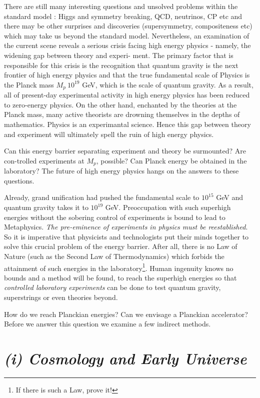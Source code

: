 There are still many interesting questions and unsolved problems within the standard
model : Higgs and symmetry breaking, QCD, neutrinos, CP etc and there may be other
surprises and discoveries (supersymmetry, compositeness etc) which may take us beyond
the standard model. Nevertheless, an examination of the current scene reveals a serious
crisis facing high energy physics - namely, the widening gap between theory and experi-
ment. The primary factor that is responsible for this crisis is the recognition that quantum
gravity is the next frontier of high energy physics and that the true fundamental scale of
Physics is the Planck mass $M_{p} ~ 10^{19}$ GeV, which is the scale of quantum gravity. As a
result, all of present-day experimental activity in high energy physics has been reduced to
zero-energy physics. On the other hand, enchanted by the theories at the Planck mass,
many active theorists are drowning themselves in the depths of mathematics. Physics is
an experimantal science. Hence this gap between theory and experiment will ultimately
spell the ruin of high energy physics.

Can this energy barrier separating experiment and theory be surmounted?
Are con-trolled experiments at $M_{p}$, possible? Can Planck energy be obtained in the laboratory?
The future of high energy physics hangs on the answers to these questions.

Already, grand unification had pushed the fundamental scale to $10^{15}$ GeV and quantum
gravity takes it to $10^{19}$ GeV. Preoccupation with such superhigh energies without the
sobering control of experiments is bound to lead to Metaphysics. \textit{The pre-eminence of
experiments in physics must be reestablished}. So it is imperative that physicists and
technologists put their minds together to solve this crucial problem of the energy barrier.
After all, there is no Law of Nature (such as the Second Law of Thermodynamics) which
forbids the attainment of such energies in the laboratory\footnote{If there is such a Law, prove it!}. Human ingenuity knows no
bounds and a method will be found, to reach the superhigh energies so that \textit{controlled
laboratory experiments} can be done to test quantum gravity, superstrings or even theories
beyond.

How do we reach Planckian energies? Can we envisage a Planckian accelerator? Before
we answer this question we examine a few indirect methods.


\section*{\textit{(i) Cosmology and Early Universe}}


